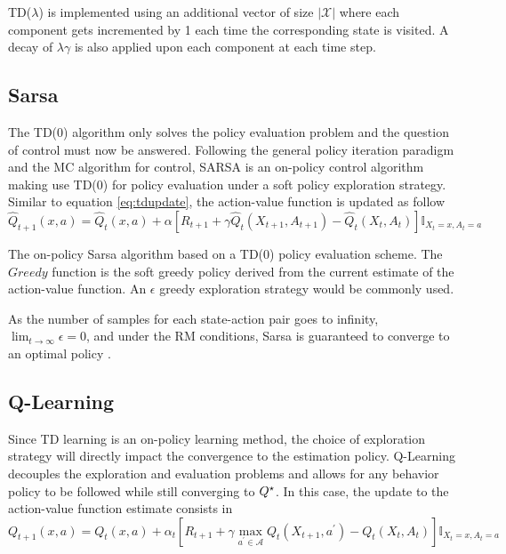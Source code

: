 TD($\lambda$) is implemented using an additional vector of size $\left\vert
\mathcal{X} \right\vert$ where each component gets incremented by 1 each time the
corresponding state is visited. A decay of $\lambda \gamma$ is also applied upon
each component at each time step. 

\subsection{Sarsa}
The TD(0) algorithm only solves the policy evaluation problem and the question of
control must now be answered. Following the general policy iteration paradigm and
the MC algorithm for control, SARSA is an on-policy control algorithm making use 
TD(0) for policy evaluation under a soft policy exploration strategy. Similar to equation
\ref{eq:tdupdate}, the action-value function is updated as follow
\begin{equation}
\hat{Q}_{t+1}(x, a) = \hat{Q}_{t}(x, a) + \alpha \left[ R_{t+1} + \gamma \hat{Q}_t
(X_{t+1}, A_{t+1}) - \hat{Q}_t(X_t, A_t)\right] \mathbb{I}_{X_t = x, A_t = a}
\label{eq:sarsaupdate}
\end{equation}

\begin{algorithm}
\DontPrintSemicolon
{}
\caption{The on-policy Sarsa algorithm based on a TD(0) policy evaluation scheme.
The $Greedy$ function is the soft greedy policy derived from the current estimate of
the action-value function. An $\epsilon$ greedy exploration strategy would be
commonly used.}
\label{alg:sarsa}
\end{algorithm}

As the number of samples for each state-action pair goes to infinity, $\lim_{t \to
\infty} \epsilon = 0$, and under the RM conditions, Sarsa is guaranteed to converge to
an optimal policy \cite{Sutton1998}. 

\subsection{Q-Learning}

Since TD learning is an on-policy learning method, the choice of exploration strategy
will directly impact the convergence to the estimation policy. Q-Learning
\cite{Watkins1989} decouples the exploration and evaluation problems and allows for
any behavior policy to be followed while still converging to $Q^\star$. In this case,
the update to the action-value function estimate consists in
\begin{equation}
Q_{t+1} (x,a) = Q_t(x,a) + \alpha_t \left[ R_{t+1} + \gamma \max_{a^\prime \in
\mathcal{A}} Q_t(X_{t+1}, a^\prime) - Q_t(X_t, A_t) \right] \mathbb{I}_{X_t = x, A_t = a} 
\label{eq:qlearning-update}
\end{equation}

